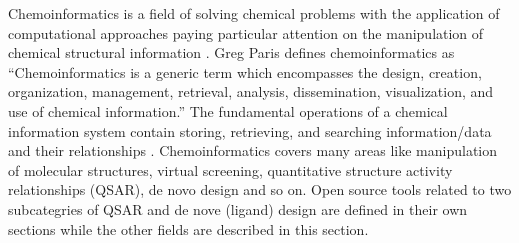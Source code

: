 Chemoinformatics is a field of solving chemical problems with the application of computational approaches paying particular attention on the manipulation of chemical structural information \cite{Leach_2007} . Greg Paris defines chemoinformatics as “Chemoinformatics is a generic term which encompasses the design, creation, organization, management, retrieval, analysis, dissemination, visualization, and use of chemical information.” The fundamental operations of a chemical information system contain storing, retrieving, and searching information/data and their relationships \cite{Gasteiger_2003}\cite{2003}. Chemoinformatics covers many areas like manipulation of molecular structures, virtual screening, quantitative structure activity relationships (QSAR), de novo design and so on. Open source tools related to two subcategries of QSAR and de nove (ligand) design are defined in their own sections while the other fields are described in this section.